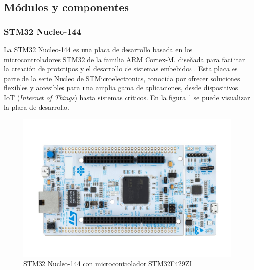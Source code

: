 \subsection{Módulos y componentes}

\subsubsection{STM32 Nucleo-144}


La STM32 Nucleo-144 es una placa de desarrollo basada en los microcontroladores STM32 de la familia ARM Cortex-M, diseñada para facilitar la creación de prototipos y el desarrollo de sistemas embebidos \cite{nucleo144}. Esta placa es parte de la serie Nucleo de STMicroelectronics, conocida por ofrecer soluciones flexibles y accesibles para una amplia gama de aplicaciones, desde dispositivos IoT (\textit{Internet of Things}) hasta sistemas críticos. En la figura \ref{fig:nucleo144} se puede visualizar la placa de desarrollo.\\


\begin{figure}[H]
    \centering
    \includegraphics[height=\linewidth, angle=90]{img/nucleo144.jpeg}
    \caption{STM32 Nucleo-144 con microcontrolador STM32F429ZI}
    \label{fig:nucleo144}
\end{figure}



